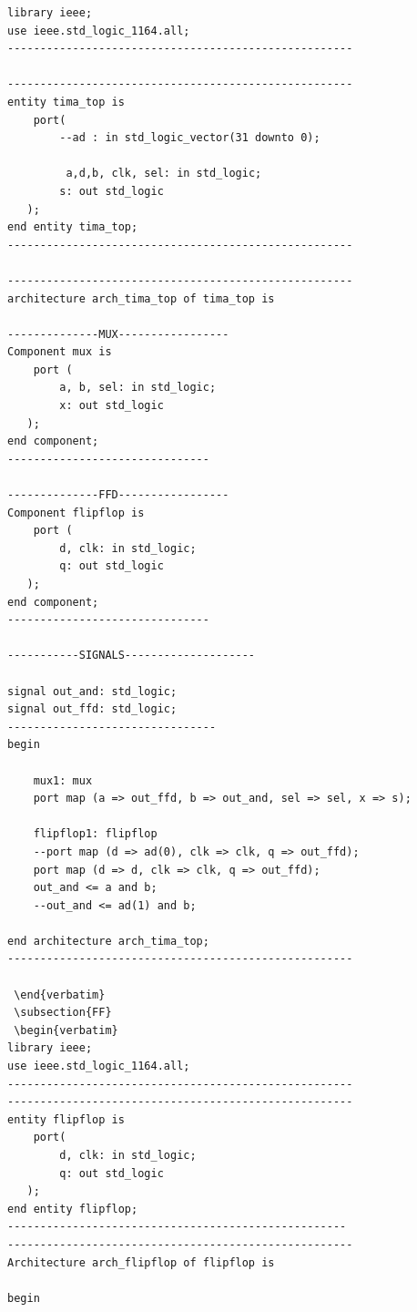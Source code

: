\documentclass[a4paper,openright,12pt]{report}
\begin{document}
\begin{lstlisting}
library ieee;
use ieee.std_logic_1164.all;
-----------------------------------------------------

-----------------------------------------------------
entity tima_top is
    port(
        --ad : in std_logic_vector(31 downto 0);
        
         a,d,b, clk, sel: in std_logic;
        s: out std_logic
   );
end entity tima_top;
-----------------------------------------------------

-----------------------------------------------------
architecture arch_tima_top of tima_top is

--------------MUX-----------------
Component mux is
    port (
        a, b, sel: in std_logic;
        x: out std_logic
   );
end component;
-------------------------------

--------------FFD-----------------
Component flipflop is
    port (
        d, clk: in std_logic;
        q: out std_logic
   );
end component;
-------------------------------

-----------SIGNALS--------------------

signal out_and: std_logic;
signal out_ffd: std_logic;
--------------------------------
begin

    mux1: mux
    port map (a => out_ffd, b => out_and, sel => sel, x => s);
    
    flipflop1: flipflop
    --port map (d => ad(0), clk => clk, q => out_ffd);
    port map (d => d, clk => clk, q => out_ffd);
    out_and <= a and b;
    --out_and <= ad(1) and b;

end architecture arch_tima_top;
-----------------------------------------------------

 \end{verbatim}
 \subsection{FF}
 \begin{verbatim}
library ieee;
use ieee.std_logic_1164.all;
-----------------------------------------------------
-----------------------------------------------------
entity flipflop is
    port(
        d, clk: in std_logic;
        q: out std_logic
   );
end entity flipflop;
----------------------------------------------------
-----------------------------------------------------
Architecture arch_flipflop of flipflop is 

begin


\end{lstlisting}
\end{document}
